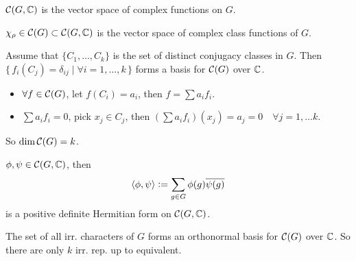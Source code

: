 \begin{definition}
  $\mathcal{C}(G, \mathbb{C})$ is the vector space of complex functions on $G$.

  $\chi_\rho \in \mathcal{C}(G) \subset \mathcal{C}(G, \mathbb{C})$
  is the vector space of complex class functions of $G$.
\end{definition}


\begin{remark}
  Assume that $\{ C_1, \dots, C_k \}$ is the set of distinct conjugacy classes
  in $G$.
  Then $\{\, f_i(C_j) = \delta_{ij} \mid \forall i = 1, \dots, k \,\}$ forms
  a basis for $\mathcal{C}(G)$ over $\mathbb{C}$.
  \begin{itemize}
    \item $\forall f \in \mathcal{C}(G)$, let $f(C_i) = a_i$, then
      $f = \sum a_i f_i$.
    \item $\sum a_i f_i = 0$, pick $x_j \in C_j$, then
      $(\sum a_if_i)(x_j) = a_j = 0 \quad \forall j = 1, \dots k$.
  \end{itemize}
  So $\dim \mathcal{C}(G) = k$.
\end{remark}

\begin{definition}
  $\phi, \psi \in \mathcal{C}(G, \mathbb{C})$, then
  \[ \langle\phi, \psi\rangle \vcentcolon= \sum_{g\in G} \phi(g) \overline{\psi(g)} \]
  is a positive definite Hermitian form on $\mathcal{C}(G, \mathbb{C})$.
\end{definition}

\begin{theorem}
  The set of all irr. characters of $G$ forms an orthonormal basis for $\mathcal{C}(G)$
  over $\mathbb{C}$. So there are only $k$ irr. rep. up to equivalent.
\end{theorem}

